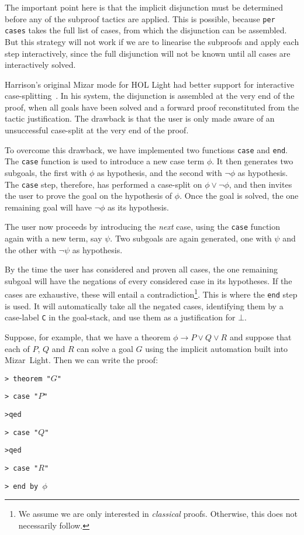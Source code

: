 The important point here is that the implicit disjunction must be determined before any of the subproof tactics are applied. This is possible, because \texttt{per cases} takes the full list of cases, from which the disjunction can be assembled. But this strategy will not work if we are to linearise the subproofs and apply each step interactively, since the full disjunction will not be known until all cases are interactively solved.

Harrison's original Mizar mode for HOL Light had better support for interactive case-splitting~\cite{MizarHOL}. In his system, the disjunction is assembled at the very end of the proof, when all goals have been solved and a forward proof reconstituted from the tactic justification. The drawback is that the user is only made aware of an unsuccessful case-split at the very end of the proof.

To overcome this drawback, we have implemented two functions \texttt{case} and \texttt{end}. The \texttt{case} function is used to introduce a new case term $\phi$. It then generates two subgoals, the first with $\phi$ as hypothesis, and the second with $\neg\phi$ as hypothesis. The \texttt{case} step, therefore, has performed a case-split on $\phi\vee\neg\phi$, and then invites the user to prove the goal on the hypothesis of $\phi$. Once the goal is solved, the one remaining goal will have $\neg\phi$ as its hypothesis. 

The user now proceeds by introducing the \emph{next} case, using the \texttt{case} function again with a new term, say $\psi$. Two subgoals are again generated, one with $\psi$ and the other with $\neg\psi$ as hypothesis.

By the time the user has considered and proven all cases, the one remaining subgoal will have the negations of every considered case in its hypotheses. If the cases are exhaustive, these will entail a contradiction\footnote{We assume we are only interested in \emph{classical} proofs. Otherwise, this does not necessarily follow.}. This is where the \texttt{end} step is used. It will automatically take all the negated cases, identifying them by a case-label \texttt{C} in the goal-stack, and use them as a justification for $\bot$.

Suppose, for example, that we have a theorem $\phi \longrightarrow P \vee Q \vee R$ and suppose that each of $P$, $Q$ and $R$ can solve a goal $G$ using the implicit automation built into Mizar~Light. Then we can write the proof:

\vspace{0.5cm}
\begin{minipage}{\linewidth}
  \footnotesize
  \texttt{> theorem "$G$"}

  \texttt{> case "$P$" }

  \texttt{>\quad qed}

  \texttt{> case "$Q$"}

  \texttt{>\quad qed}

  \texttt{> case "$R$"}

  \texttt{> end by $\phi$}
\end{minipage}
\vspace{0.5cm} 

